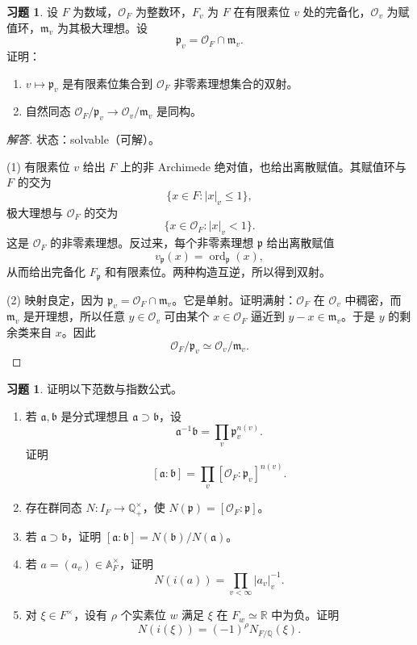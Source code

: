 \documentclass[11pt,a4paper,openany]{ctexbook}
\numberwithin{equation}{chapter}
\newcommand{\Q}{\mathbb{Q}}
\newcommand{\R}{\mathbb{R}}
\newcommand{\A}{\mathbb{A}}
\theoremstyle{plain}
\theoremstyle{definition}
\newtheorem{exercise}[theorem]{习题}
\theoremstyle{remark}
\begin{document}
\begin{exercise}
设 $F$ 为数域，$\mathcal O_F$ 为整数环，$F_v$ 为 $F$ 在有限素位 $v$ 处的完备化，$\mathcal O_v$ 为赋值环，$\mathfrak m_v$ 为其极大理想。设
\[
 \mathfrak p_v=\mathcal O_F\cap\mathfrak m_v.
\]
证明：
\begin{enumerate}[label=(\arabic*)]
\item $v\mapsto\mathfrak p_v$ 是有限素位集合到 $\mathcal O_F$ 非零素理想集合的双射。
\item 自然同态 $\mathcal O_F/\mathfrak p_v\to\mathcal O_v/\mathfrak m_v$ 是同构。
\end{enumerate}
\end{exercise}

\begin{proof}[解答]
状态：solvable（可解）。

(1) 有限素位 $v$ 给出 $F$ 上的非 Archimede 绝对值，也给出离散赋值。其赋值环与 $F$ 的交为
\[
 \{x\in F: |x|_v\le1\},
\]
极大理想与 $\mathcal O_F$ 的交为
\[
 \{x\in\mathcal O_F: |x|_v<1\}.
\]
这是 $\mathcal O_F$ 的非零素理想。反过来，每个非零素理想 $\mathfrak p$ 给出离散赋值
\[
 v_\mathfrak p(x)=\operatorname{ord}_\mathfrak p(x),
\]
从而给出完备化 $F_\mathfrak p$ 和有限素位。两种构造互逆，所以得到双射。

(2) 映射良定，因为 $\mathfrak p_v=\mathcal O_F\cap\mathfrak m_v$。它是单射。证明满射：$\mathcal O_F$ 在 $\mathcal O_v$ 中稠密，而 $\mathfrak m_v$ 是开理想，所以任意 $y\in\mathcal O_v$ 可由某个 $x\in\mathcal O_F$ 逼近到 $y-x\in\mathfrak m_v$。于是 $y$ 的剩余类来自 $x$。因此
\[
 \mathcal O_F/\mathfrak p_v\simeq\mathcal O_v/\mathfrak m_v.
\]
\end{proof}

\begin{exercise}
证明以下范数与指数公式。
\begin{enumerate}[label=(\arabic*)]
\item 若 $\mathfrak a,\mathfrak b$ 是分式理想且 $\mathfrak a\supset\mathfrak b$，设
\[
 \mathfrak a^{-1}\mathfrak b=\prod_v\mathfrak p_v^{n(v)}.
\]
证明
\[
 [\mathfrak a:\mathfrak b]=\prod_v[\mathcal O_F:\mathfrak p_v]^{n(v)}.
\]
\item 存在群同态 $N:I_F\to\Q_+^\times$，使 $N(\mathfrak p)=[\mathcal O_F:\mathfrak p]$。
\item 若 $\mathfrak a\supset\mathfrak b$，证明 $[\mathfrak a:\mathfrak b]=N(\mathfrak b)/N(\mathfrak a)$。
\item 若 $a=(a_v)\in\A_F^\times$，证明
\[
 N(i(a))=\prod_{v<\infty}|a_v|_v^{-1}.
\]
\item 对 $\xi\in F^\times$，设有 $\rho$ 个实素位 $w$ 满足 $\xi$ 在 $F_w\simeq\R$ 中为负。证明
\[
 N(i(\xi))=(-1)^\rho N_{F/\Q}(\xi).
\]
\end{enumerate}
\end{exercise}
\end{document}
